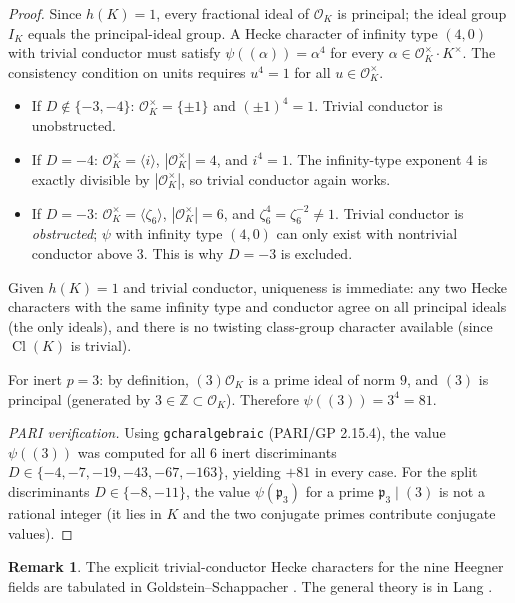 \documentclass[12pt]{amsart}
\theoremstyle{definition}
\newtheorem{remark}[theorem]{Remark}
\DeclareMathOperator{\Cl}{Cl}
\newcommand{\Z}{\mathbb{Z}}
\newcommand{\OK}{\mathcal{O}_K}
\newcommand{\fp}{\mathfrak{p}}
\newcommand{\CiteNeeded}[1]{}
\begin{document}
\begin{proof}
  Since $h(K) = 1$, every fractional ideal of $\OK$ is principal; the ideal
  group $I_K$ equals the principal-ideal group.
  A Hecke character of infinity type $(4, 0)$ with trivial conductor must
  satisfy $\psi((\alpha)) = \alpha^4$ for every $\alpha \in \OK^\times \cdot
  K^\times$.
  The consistency condition on units requires $u^4 = 1$ for all $u \in
  \OK^\times$.

  \begin{itemize}
    \item If $D \notin \{-3, -4\}$: $\OK^\times = \{\pm 1\}$ and
          $(\pm 1)^4 = 1$.
          Trivial conductor is unobstructed.
    \item If $D = -4$: $\OK^\times = \langle i \rangle$, $|\OK^\times| = 4$,
          and $i^4 = 1$.
          The infinity-type exponent $4$ is exactly divisible by $|\OK^\times|$,
          so trivial conductor again works.
    \item If $D = -3$: $\OK^\times = \langle \zeta_6 \rangle$, $|\OK^\times|
          = 6$, and $\zeta_6^4 = \zeta_6^{-2} \neq 1$.
          Trivial conductor is \emph{obstructed}; $\psi$ with infinity type
          $(4, 0)$ can only exist with nontrivial conductor above $3$.
          This is why $D = -3$ is excluded.
  \end{itemize}

  Given $h(K) = 1$ and trivial conductor, uniqueness is immediate: any two
  Hecke characters with the same infinity type and conductor agree on all
  principal ideals (the only ideals), and there is no twisting class-group
  character available (since $\Cl(K)$ is trivial).

  For inert $p = 3$: by definition, $(3)\OK$ is a prime ideal of norm $9$,
  and $(3)$ is principal (generated by $3 \in \Z \subset \OK$).
  Therefore $\psi((3)) = 3^4 = 81$.

  \emph{PARI verification.}
  Using \texttt{gcharalgebraic} (PARI/GP 2.15.4), the value $\psi((3))$
  was computed for all $6$ inert discriminants
  $D \in \{-4, -7, -19, -43, -67, -163\}$, yielding $+81$ in every case.
  For the split discriminants $D \in \{-8, -11\}$, the value $\psi(\fp_3)$
  for a prime $\fp_3 \mid (3)$ is not a rational integer (it lies in $K$
  and the two conjugate primes contribute conjugate values).
\end{proof}

\begin{remark}
  The explicit trivial-conductor Hecke characters for the nine Heegner
  fields are tabulated in Goldstein--Schappacher
  \CiteNeeded{GoldsteinSchappacher 1981, \S1, Tables 1--2}.
  The general theory is in Lang \CiteNeeded{Lang ANT, XII \S2}.
\end{remark}
\end{document}
